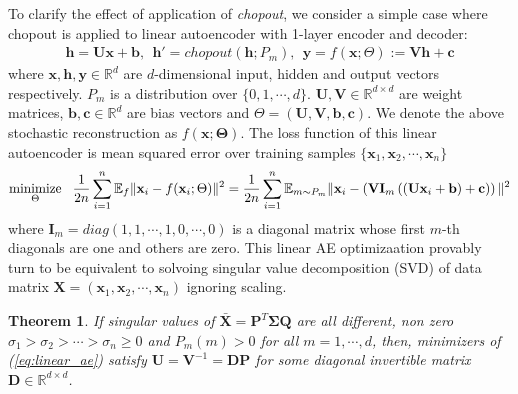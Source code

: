 \documentclass{article}
\newtheorem{theorem}{Theorem}
\newcommand{\minimize}{\mathop{\rm minimize}\limits}
\begin{document}
    To clarify the effect of application of \textit{chopout}, we consider a simple case where chopout is applied to linear autoencoder with 1-layer encoder and decoder:
    \begin{align}
        \mathbf{h} = \mathbf{U} \mathbf{x} + \mathbf{b}, \ \ 
        \mathbf{h'} = chopout(\mathbf{h}; P_m), \nonumber \ \
        \mathbf{y} = f(\mathbf{x}; \Theta) := \mathbf{V} \mathbf{h} + \mathbf{c} \nonumber
    \end{align}
    where $\mathbf{x},\mathbf{h}, \mathbf{y} \in \mathbb{R}^d$ are $d$-dimensional input, hidden and output vectors respectively. $P_m$ is a distribution over $\{0, 1, \cdots, d\}$. $\mathbf{U}, \mathbf{V} \in \mathbb{R}^{d \times d}$ are weight matrices, $\mathbf{b}, \mathbf{c} \in \mathbb{R}^d$ are bias vectors and $\Theta = (\mathbf{U}, \mathbf{V}, \mathbf{b}, \mathbf{c})$. We denote the above stochastic reconstruction as $f(\mathbf{x}; \mathbf{\Theta})$. The loss function of this linear autoencoder is mean squared error over training samples $\{\mathbf{x}_1, \mathbf{x}_2, \cdots, \mathbf{x}_n\}$
    \begin{align}
        \minimize_{\Theta} \ \  
        \frac{1}{2n} \sum_{i=1}^n \mathbb{E}_{f} \Vert \mathbf{x}_i - f(\mathbf{x}_i; \Theta) \Vert^2
        = \frac{1}{2n} \sum_{i=1}^n \mathbb{E}_{m \sim P_m} \Vert \mathbf{x}_i - \left( \mathbf{V} \mathbf{I}_m \left( \left( \mathbf{U} \mathbf{x}_i + \mathbf{b} \right) + \mathbf{c} \right) \right) \Vert^2 \label{eq:linear_ae}
    \end{align}
    where $\mathbf{I}_m = diag(1, 1, \cdots, 1, 0, \cdots, 0)$ is a diagonal matrix whose first $m$-th diagonals are one and others are zero. This linear AE optimizaation provably turn to be equivalent to solvoing singular value decomposition (SVD) of data matrix $\mathbf{X} = (\mathbf{x}_1, \mathbf{x}_2, \cdots, \mathbf{x}_n)$ ignoring scaling.

    \begin{theorem}
      \label{th:svd}
      If singular values of $\bar{\mathbf{X}} = \mathbf{P}^T \mathbf{\Sigma} \mathbf{Q}$ are all different, non zero $\sigma_1 > \sigma_2 > \cdots > \sigma_n \geq 0$ and $P_m(m) > 0$ for all $m = 1, \cdots, d$, then, minimizers of (\ref{eq:linear_ae}) satisfy $\mathbf{U} = \mathbf{V}^{-1} = \mathbf{D} \mathbf{P}$ for some diagonal invertible matrix $\mathbf{D} \in \mathbb{R}^{d \times d}$.
    \end{theorem}

\end{document}

